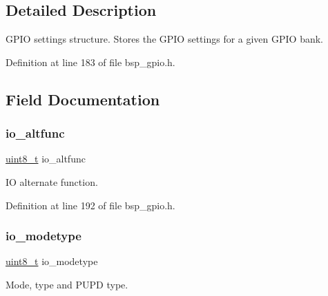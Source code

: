 \subsection{Detailed Description}
G\+P\+IO settings structure. Stores the G\+P\+IO settings for a given G\+P\+IO bank. 

Definition at line 183 of file bsp\+\_\+gpio.\+h.



\subsection{Field Documentation}
\mbox{\label{struct_g_p_i_o___s_e_t_t_i_n_g_s_a4555d90ee383bdb9bf2fc3b049f32fd1}} 
\subsubsection{\texorpdfstring{io\+\_\+altfunc}{io\_altfunc}}
{\footnotesize\ttfamily \hyperlink{stdint_8h_aba7bc1797add20fe3efdf37ced1182c5}{uint8\+\_\+t} io\+\_\+altfunc}



IO alternate function. 



Definition at line 192 of file bsp\+\_\+gpio.\+h.

\mbox{\label{struct_g_p_i_o___s_e_t_t_i_n_g_s_aca4ea33051d3d932467e31db14e636aa}} 
\subsubsection{\texorpdfstring{io\+\_\+modetype}{io\_modetype}}
{\footnotesize\ttfamily \hyperlink{stdint_8h_aba7bc1797add20fe3efdf37ced1182c5}{uint8\+\_\+t} io\+\_\+modetype}



Mode, type and P\+U\+PD type. 



